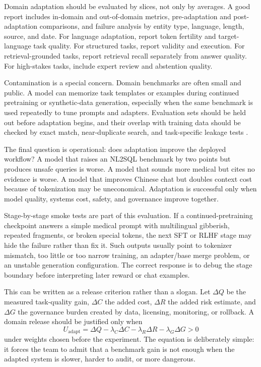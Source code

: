 Domain adaptation should be evaluated by slices, not only by averages. A good report includes in-domain and out-of-domain metrics, pre-adaptation and post-adaptation comparisons, and failure analysis by entity type, language, length, source, and date. For language adaptation, report token fertility and target-language task quality. For structured tasks, report validity and execution. For retrieval-grounded tasks, report retrieval recall separately from answer quality. For high-stakes tasks, include expert review and abstention quality.

Contamination is a special concern. Domain benchmarks are often small and public. A model can memorize task templates or examples during continued pretraining or synthetic-data generation, especially when the same benchmark is used repeatedly to tune prompts and adapters. Evaluation sets should be held out before adaptation begins, and their overlap with training data should be checked by exact match, near-duplicate search, and task-specific leakage tests \cite{xu2024benchmark}.

The final question is operational: does adaptation improve the deployed workflow? A model that raises an NL2SQL benchmark by two points but produces unsafe queries is worse. A model that sounds more medical but cites no evidence is worse. A model that improves Chinese chat but doubles context cost because of tokenization may be uneconomical. Adaptation is successful only when model quality, systems cost, safety, and governance improve together.

Stage-by-stage smoke tests are part of this evaluation. If a continued-pretraining checkpoint answers a simple medical prompt with multilingual gibberish, repeated fragments, or broken special tokens, the next SFT or RLHF stage may hide the failure rather than fix it. Such outputs usually point to tokenizer mismatch, too little or too narrow training, an adapter/base merge problem, or an unstable generation configuration. The correct response is to debug the stage boundary before interpreting later reward or chat examples.

This can be written as a release criterion rather than a slogan. Let $\Delta Q$ be the measured task-quality gain, $\Delta C$ the added cost, $\Delta R$ the added risk estimate, and $\Delta G$ the governance burden created by data, licensing, monitoring, or rollback. A domain release should be justified only when
\[
  U_{\mathrm{adapt}}
  =
  \Delta Q
  -
  \lambda_C \Delta C
  -
  \lambda_R \Delta R
  -
  \lambda_G \Delta G
  > 0
\]
under weights chosen before the experiment. The equation is deliberately simple: it forces the team to admit that a benchmark gain is not enough when the adapted system is slower, harder to audit, or more dangerous.

